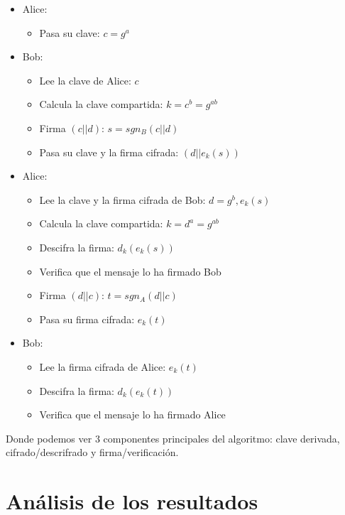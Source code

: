 \documentclass[a4paper, 11pt]{article}
\begin{document}
		\begin{itemize}
			\item Alice:
			\begin{itemize}
				\item Pasa su clave: $c = g^a$
			\end{itemize}
			\item Bob:
			\begin{itemize}
				\item Lee la clave de Alice: $c$
				\item Calcula la clave compartida: $k = c^b = g^{ab}$
				\item Firma $(c || d)$: $s = sgn_B (c || d)$
				\item Pasa su clave y la firma cifrada: $(d || e_k(s))$
			\end{itemize}
			\item Alice:
			\begin{itemize}
				\item Lee la clave y la firma cifrada de Bob: $d = g^b, e_k(s)$
				\item Calcula la clave compartida: $k = d^a = g^{ab}$
				\item Descifra la firma: $d_k(e_k(s))$
				\item Verifica que el mensaje lo ha firmado Bob
				\item Firma $(d || c)$: $t = sgn_A (d || c)$
				\item Pasa su firma cifrada: $e_k(t)$
			\end{itemize}
			\item Bob:
			\begin{itemize}
				\item Lee la firma cifrada de Alice: $e_k(t)$
				\item Descifra la firma: $d_k(e_k(t))$
				\item Verifica que el mensaje lo ha firmado Alice
			\end{itemize}
		\end{itemize}
		
		Donde podemos ver 3 componentes principales del algoritmo: clave derivada, cifrado/descrifrado y firma/verificación.
		
\section{Análisis de los resultados}
	
\end{document}
